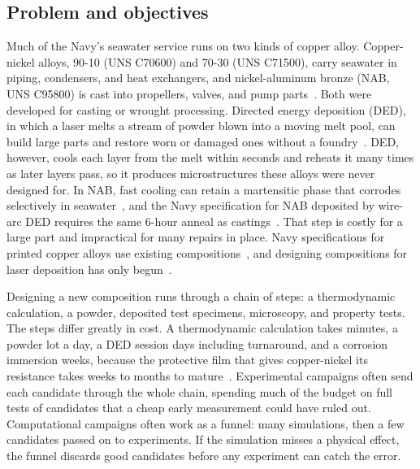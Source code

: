 \documentclass[12pt,letterpaper]{article}
\begin{document}
\subsection{Problem and objectives}

Much of the Navy's seawater service runs on two kinds of copper alloy.
Copper-nickel alloys, 90-10 (UNS C70600) and 70-30 (UNS C71500), carry
seawater in piping, condensers, and heat exchangers, and nickel-aluminum
bronze (NAB, UNS C95800) is cast into propellers, valves, and pump
parts~\cite{milt16420,milb24480,cda222}. Both were developed for casting or wrought processing.
Directed energy deposition (DED), in which a laser melts a stream of powder
blown into a moving melt pool, can build large parts and restore worn or
damaged ones without a foundry~\cite{saboori2019,cao2019}. DED, however, cools each
layer from the melt within seconds and reheats it many times as later layers
pass, so it produces microstructures these alloys were never designed for. In
NAB, fast cooling can retain a martensitic phase that corrodes selectively in
seawater~\cite{liu2021,dobson2024}, and the Navy specification for NAB deposited
by wire-arc DED requires the same 6-hour anneal as castings~\cite{milprf32816}.
That step is costly for a large part and impractical for many repairs in
place. Navy specifications for printed copper alloys use existing
compositions~\cite{milprf32816,milprf32804,milprf32815}, and designing
compositions for laser deposition has only begun~\cite{jia2026}.

Designing a new composition runs through a chain of steps: a thermodynamic
calculation, a powder, deposited test specimens, microscopy, and property
tests. The steps differ greatly in cost. A thermodynamic calculation takes
minutes, a powder lot a day, a DED session days including turnaround, and a
corrosion immersion weeks, because the protective film that gives
copper-nickel its resistance takes weeks to months to
mature~\cite{ma2015,ekerenam2018}. Experimental campaigns often send each
candidate through the whole chain, spending much of the budget on full tests
of candidates that a cheap early measurement could have ruled out.
Computational campaigns often work as a funnel: many simulations, then a few
candidates passed on to experiments. If the simulation misses a physical
effect, the funnel discards good candidates before any experiment can catch
the error.
\end{document}
